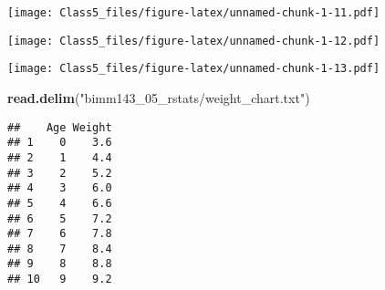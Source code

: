 \documentclass[]{article}
\newenvironment{Shaded}{\begin{snugshade}}{\end{snugshade}}
\newcommand{\CharTok}[1]{\textcolor[rgb]{0.31,0.60,0.02}{#1}}
\newcommand{\DataTypeTok}[1]{\textcolor[rgb]{0.13,0.29,0.53}{#1}}
\newcommand{\DecValTok}[1]{\textcolor[rgb]{0.00,0.00,0.81}{#1}}
\newcommand{\KeywordTok}[1]{\textcolor[rgb]{0.13,0.29,0.53}{\textbf{#1}}}
\newcommand{\NormalTok}[1]{#1}
\newcommand{\OperatorTok}[1]{\textcolor[rgb]{0.81,0.36,0.00}{\textbf{#1}}}
\newcommand{\OtherTok}[1]{\textcolor[rgb]{0.56,0.35,0.01}{#1}}
\newcommand{\StringTok}[1]{\textcolor[rgb]{0.31,0.60,0.02}{#1}}
\begin{document}
\texttt{[image: Class5\_files/figure-latex/unnamed-chunk-1-11.pdf]}

\begin{Shaded}
\end{Shaded}

\texttt{[image: Class5\_files/figure-latex/unnamed-chunk-1-12.pdf]}

\begin{Shaded}
\end{Shaded}

\texttt{[image: Class5\_files/figure-latex/unnamed-chunk-1-13.pdf]}

\begin{Shaded}
\begin{Highlighting}[]
\KeywordTok{read.delim}\NormalTok{(}\StringTok{"bimm143_05_rstats/weight_chart.txt"}\NormalTok{)}
\end{Highlighting}
\end{Shaded}

\begin{verbatim}
##    Age Weight
## 1    0    3.6
## 2    1    4.4
## 3    2    5.2
## 4    3    6.0
## 5    4    6.6
## 6    5    7.2
## 7    6    7.8
## 8    7    8.4
## 9    8    8.8
## 10   9    9.2
\end{verbatim}

\begin{Shaded}
\end{Shaded}
\end{document}
